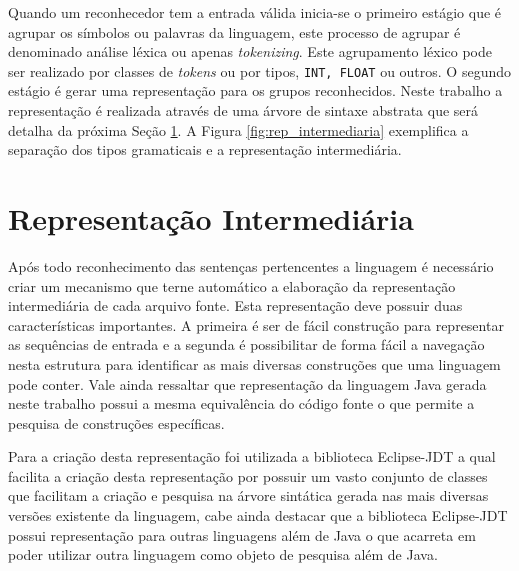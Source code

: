 Quando um reconhecedor tem a entrada válida inicia-se o primeiro estágio que é agrupar os símbolos ou palavras da linguagem, este processo de agrupar é denominado análise léxica ou apenas \textit{tokenizing}. Este agrupamento léxico pode ser realizado por classes de \textit{tokens} ou por tipos, \texttt{INT, FLOAT} ou outros. O segundo estágio é gerar uma representação para os grupos reconhecidos. Neste trabalho a representação é realizada através de uma árvore de sintaxe abstrata que será detalha da próxima Seção \ref{sec:parser}. A Figura \ref{fig:rep_intermediaria} exemplifica a separação dos tipos gramaticais e a representação intermediária.




\section{Representação Intermediária}\label{sec:parser}
Após todo reconhecimento das sentenças pertencentes a linguagem é necessário criar um mecanismo que terne automático a elaboração da representação intermediária de cada arquivo fonte. Esta representação deve possuir duas características importantes. A primeira é ser de fácil construção para representar as sequências de entrada e a segunda é possibilitar de forma fácil a navegação nesta estrutura para identificar as mais diversas construções que uma linguagem pode conter. Vale ainda ressaltar que representação da linguagem Java gerada neste trabalho possui a mesma equivalência do código fonte o que permite a pesquisa de construções específicas. 

Para a criação desta representação foi utilizada a biblioteca Eclipse-JDT a qual facilita a criação desta representação por possuir um vasto conjunto de classes que facilitam a criação e pesquisa na árvore sintática gerada nas mais diversas versões existente da linguagem, cabe ainda destacar que a biblioteca Eclipse-JDT possui representação para outras linguagens além de Java o que acarreta em poder utilizar outra linguagem como objeto de pesquisa além de Java.
 
